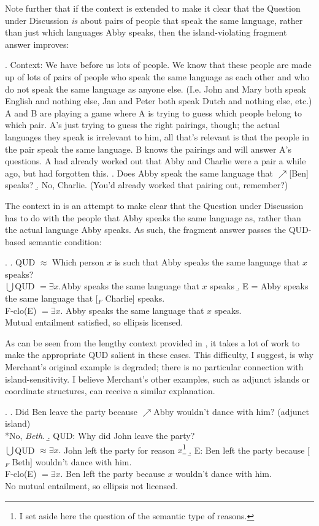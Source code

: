 \documentclass[11pt,letterpaper]{article}
\begin{document}
Note further that if the context is extended to make it clear that the Question under Discussion \emph{is} about pairs of people that speak the same language, rather than just which languages Abby speaks, then the island-violating fragment answer improves:

\ex. 	Context: We have before us lots of people. We know that these people are made up of lots of pairs of people who speak the same language as each other and who do not speak the same language as anyone else. (I.e. John and Mary both speak English and nothing else, Jan and Peter both speak Dutch and nothing else, etc.) A and B are playing a game where A is trying to guess which people belong to which pair. A's just trying to guess the right pairings, though; the actual languages they speak is irrelevant to him, all that's relevant is that the people in the pair speak the same language. B knows the pairings and will answer A's questions. A had already worked out that Abby and Charlie were a pair a while ago, but had forgotten this.
	\a. Does Abby speak the same language that $\nearrow$[Ben] speaks?
	\b. No, Charlie. (You'd already worked that pairing out, remember?)

The context in \Last is an attempt to make clear that the Question under Discussion has to do with the people that Abby speaks the same language as, rather than the actual language Abby speaks. As such, the fragment answer passes the QUD-based semantic condition:

\ex. 	\a. QUD $\approx$ Which person $x$ is such that Abby speaks the same language that $x$ speaks?\\
	    $\bigcup$QUD $= \exists x. $Abby speaks the same language that $x$ speaks
	\b. E = Abby speaks the same language that [$_F$ Charlie] speaks.\\
	   F-clo(E) $= \exists x.$ Abby speaks the same language that $x$ speaks.\\
	   Mutual entailment satisfied, so ellipsis licensed.
	   
As can be seen from the lengthy context provided in \LLast, it takes a lot of work to make the appropriate QUD salient in these cases. This difficulty, I suggest, is why Merchant's original example is degraded; there is no particular connection with island-sensitivity. I believe Merchant's other examples, such as adjunct islands or coordinate structures, can receive a similar explanation.

\ex. 	\a. Did Ben leave the party because $\nearrow$Abby wouldn't dance with him? \hfill (adjunct island)\\
	{}*No, \emph{Beth}.
	\b. QUD: Why did John leave the party?\\
		$\bigcup$QUD $ \approx \exists x.$ John left the party for reason $x$\footnote{I set aside here the question of the semantic type of reasons.}
	\b. E: Ben left the party because [$_F$ Beth] wouldn't dance with him.\\
		F-clo(E) $= \exists x. $ Ben left the party because $x$ wouldn't dance with him.\\
	No mutual entailment, so ellipsis not licensed.
\end{document}
